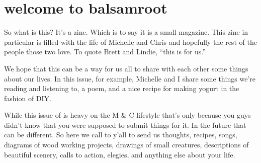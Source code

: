 \documentclass[10pt,a6paper,footinclude=false,firstfoot=false,headinclude=true,open=any,DIV=6]{scrbook} %
\begin{document}
\thispagestyle{empty}
\hbox{}
\newpage
{}
    
    \setcounter{page}{1}
    \thispagestyle{empty}
    \pagecolor{geraniumTitleColor}
   
    
    
    
    
    \begin{center}
    
    \noindent{}
    \end{center}
   
    \newpage
    \pagecolor{white}
    \restoregeometry
    \normalfont
    \normalsize
    \color{black}
    
    \setcounter{page}{2}
    
\chapter{welcome to balsamroot}


		
So what is this? It's a zine. Which is to say it is a small magazine. This zine in particular is filled with the life of Michelle and Chris and hopefully the rest of the people those two love. To quote Brett and Lindie, ``this is for us.''

We hope that this can be a way for us all to share with each other some things about our lives. In this issue, for example, Michelle and I share some things we're reading and listening to, a poem, and a nice recipe for making yogurt in the fashion of DIY.

While this issue of  is heavy on the M \& C lifestyle that's only because you guys didn't know that you were supposed to submit things for it. In the future that can be different. So here we call to y'all to send us thoughts, recipes, songs, diagrams of wood working projects, drawings of small creatures, descriptions of beautiful scenery, calls to action, elegies, and anything else about your life.
\end{document}
